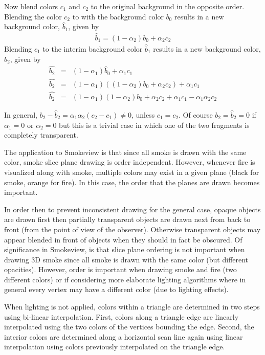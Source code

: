 \documentclass[11pt,twoside]{book}
\begin{document}
Now blend colors $c_1$ and $c_2$ to the original background in the
opposite order. Blending the color $c_2$ to with the background
color $b_0$ results in a new background color, $\hat{b}_1$, given
by
\begin{eqnarray}
\hat{b}_1=(1-\alpha_2)b_0 + \alpha_2c_2
\end{eqnarray}
Blending $c_1$ to the interim background color $\hat{b}_1$ results in a new background color,
$\hat{b}_2$, given by
\begin{eqnarray}
\hat{b_2}&=&(1-\alpha_1)\hat{b}_0+\alpha_1c_1\\
\hat{b_2}&=&(1-\alpha_1)((1-\alpha_2)b_0 + \alpha_2c_2)+\alpha_1c_1\\
\hat{b_2}&=&(1-\alpha_1)(1-\alpha_2)b_0 + \alpha_2c_2 + \alpha_1c_1 - \alpha_1\alpha_2c_2
\end{eqnarray}


In general, $b_2-\hat{b}_2=\alpha_1\alpha_2(c_2-c_1)\ne 0$, unless
$c_1=c_2$.  Of course $b_2=\hat{b}_2=0$ if $\alpha_1=0$ or
$\alpha_2=0$ but this is a trivial case in which one of the two
fragments is completely transparent.

The application to Smokeview is that since all smoke is drawn with
the same color, smoke slice plane drawing is order independent.
However, whenever fire is visualized along with smoke, multiple
colors may exist in a given plane (black for smoke, orange for
fire).  In this case, the order that the planes are drawn becomes
important.

In order then to prevent inconsistent drawing for the general
case, opaque objects are drawn first then partially transparent
objects are drawn next from back to front (from the point of view
of the observer). Otherwise transparent objects may appear blended
in front of objects when they should in fact be obscured. Of
significance in Smokeview, is that slice plane ordering is not
important when drawing 3D smoke since all smoke is drawn with the
same color (but different opacities).  However, order is important
when drawing smoke and fire (two different colors) or if
considering more elaborate lighting algorithms where in general
every vertex may have a different color (due to lighting effects).

When lighting is not applied, colors within a triangle are
determined in two steps using bi-linear interpolation. First,
colors along a triangle edge are linearly interpolated using the
two colors of the vertices bounding the edge. Second, the interior
colors are determined along a horizontal scan line again using
linear interpolation using colors previously interpolated on the
triangle edge.
\end{document}
